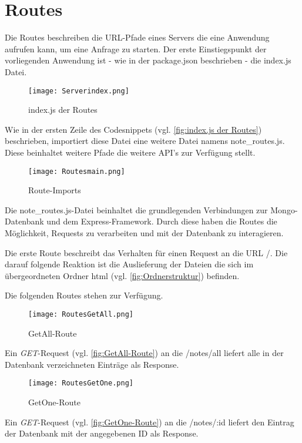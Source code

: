 
\chapter{Routes}
\label{ch:Routes}
Die Routes beschreiben die URL-Pfade eines Servers die eine Anwendung aufrufen kann, um eine Anfrage zu starten.
Der erste Einstiegspunkt der vorliegenden Anwendung ist - wie in der package.json beschrieben - die index.js Datei.

\begin{figure}[h]
\texttt{[image: Serverindex.png]}
\vspace{3pt}
\caption{index.js der Routes}
\label{fig:index.js der Routes}
\end{figure}

Wie in der ersten Zeile des Codesnippets (vgl. \autoref{fig:index.js der Routes}) beschrieben, importiert diese Datei eine weitere Datei namens \glqq note\_routes.js\grqq{}. Diese beinhaltet weitere Pfade die weitere \acs{API}'s zur Verfügung stellt.

\begin{figure}[h]
\texttt{[image: Routesmain.png]}
\vspace{3pt}
\caption{Route-Imports}
\label{fig:Route-Imports}
\end{figure}

Die \glqq note\_routes.js\grqq -Datei beinhaltet die grundlegenden Verbindungen zur Mongo-Datenbank und dem Express-Framework. Durch diese haben die Routes die Möglichkeit, Requests zu verarbeiten und mit der Datenbank zu interagieren.

Die erste Route beschreibt das Verhalten für einen Request an die URL \glqq /\grqq . Die darauf folgende Reaktion ist die Auslieferung der Dateien die sich im übergeordneten Ordner \glqq html \grqq{}(vgl. \autoref{fig:Ordnerstruktur}) befinden.

Die folgenden Routes stehen zur Verfügung.
\begin{center}
\begin{figure}[h!]
\texttt{[image: RoutesGetAll.png]}
\vspace{1pt}
\caption{GetAll-Route}
\label{fig:GetAll-Route}
\end{figure}
\end{center}
Ein \textit{GET}-Request (vgl. \autoref{fig:GetAll-Route}) an die \glqq /notes/all\grqq{} liefert alle in der Datenbank verzeichneten Einträge als Response.
\begin{center}
\begin{figure}[h!]
\centering
\texttt{[image: RoutesGetOne.png]}
\vspace{1pt}
\caption{GetOne-Route}
\label{fig:GetOne-Route}
\end{figure}
\end{center}
Ein \textit{GET}-Request (vgl. \autoref{fig:GetOne-Route})  an die \glqq /notes/:id\grqq{} liefert den Eintrag der Datenbank mit der angegebenen ID als Response.

